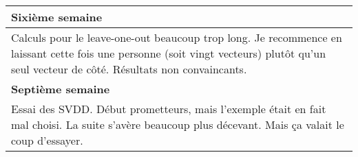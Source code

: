 \begin{longtable}{|p{\textwidth}|}
\hline
\textbf{Sixième semaine}\\
\hline
Calculs pour le leave-one-out beaucoup trop long. Je recommence en laissant cette fois une personne (soit vingt vecteurs) plutôt qu'un seul vecteur de côté. Résultats non convaincants. \\
\hline
\textbf{Septième semaine}\\
\hline
Essai des SVDD. Début prometteurs, mais l'exemple était en fait mal choisi. La suite s'avère beaucoup plus décevant. Mais ça valait le coup d'essayer.\\
\hline
\end{longtable}
